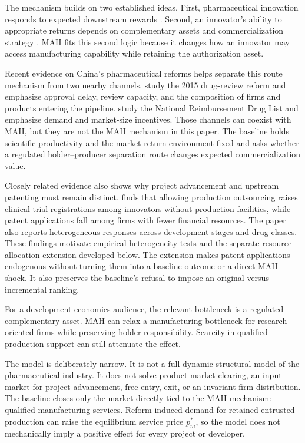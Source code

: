 \documentclass[12pt]{article}
\newcommand{\1}{\mathbf{1}}
\begin{document}
The mechanism builds on two established ideas. First, pharmaceutical
innovation responds to expected downstream rewards
\citep{Schmookler1966,AcemogluLinn2004,Finkelstein2004,DuboisDeMouzonScottMortonSeabright2015,BudishRoinWilliams2015}.
Second, an innovator's ability to appropriate returns depends on complementary
assets and commercialization strategy
\citep{Teece1986,AroraFosfuriGambardella2001,GansStern2003}. MAH fits this
second logic because it changes how an innovator may access manufacturing
capability while retaining the authorization asset.

Recent evidence on China's pharmaceutical reforms helps separate this route
mechanism from two nearby channels. \citet{JiaMaYangZhang2023} study the 2015
drug-review reform and emphasize approval delay, review capacity, and the
composition of firms and products entering the pipeline.
\citet{BarwickXiaXia2026} study the National Reimbursement Drug List and
emphasize demand and market-size incentives. Those channels can coexist with
MAH, but they are not the MAH mechanism in this paper. The baseline holds
scientific productivity and the market-return environment fixed and asks
whether a regulated holder--producer separation route changes expected
commercialization value.

Closely related evidence also shows why project advancement and upstream
patenting must remain distinct. \citet{Gu2024} finds that allowing production
outsourcing raises clinical-trial registrations among innovators without
production facilities, while patent applications fall among firms with fewer
financial resources. The paper also reports heterogeneous responses across
development stages and drug classes. These findings motivate empirical
heterogeneity tests and the separate resource-allocation extension developed
below. The extension makes patent applications endogenous without turning
them into a baseline outcome or a direct MAH shock. It also preserves the
baseline's refusal to impose an original-versus-incremental ranking.

For a development-economics audience, the relevant bottleneck is a regulated
complementary asset. MAH can relax a manufacturing bottleneck for
research-oriented firms while preserving holder responsibility. Scarcity in
qualified production support can still attenuate the effect.

The model is deliberately narrow. It is not a full dynamic structural model
of the pharmaceutical industry. It does not solve product-market clearing,
an input market for project advancement, free entry, exit, or an invariant
firm distribution. The baseline closes only the market directly tied to the
MAH mechanism: qualified manufacturing services. Reform-induced demand for
retained entrusted production can raise the equilibrium service price
\(p_m^*\), so the model does not mechanically imply a positive effect for
every project or developer.
\end{document}
